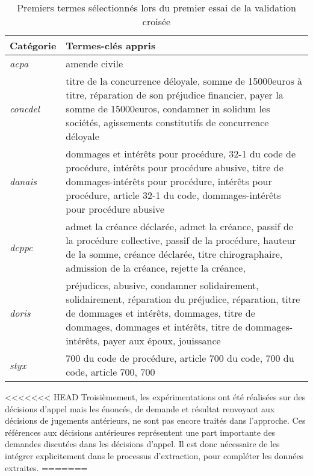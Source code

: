 \begin{table}[!htb]
		\centering\scriptsize
	\begin{tabular}{|l|p{}|}
		\hline
		\textbf{Catégorie} & \textbf{Termes-clés appris} \\ \hline
		\textit{acpa}    & amende civile                                                                                                                                                                                                                               \\ \hline
		\textit{concdel} & titre de la concurrence déloyale, somme de 15000euros à titre, réparation de son préjudice financier, payer la somme de 15000euros, condamner in solidum les sociétés, agissements constitutifs de concurrence déloyale                   \\ \hline
		\textit{danais}  & dommages et intérêts pour procédure, 32-1 du code de procédure, intérêts pour procédure abusive, titre de dommages-intérêts pour procédure, intérêts pour procédure, article 32-1 du code, dommages-intérêts pour procédure abusive         \\ \hline
		\textit{dcppc}   & admet la créance déclarée, admet la créance, passif de la procédure collective, passif de la procédure, hauteur de la somme, créance déclarée, titre chirographaire, admission de la créance, rejette la créance,                           \\ \hline
		\textit{doris}   & préjudices, abusive, condamner solidairement, solidairement, réparation du préjudice, réparation, titre de dommages et intérêts, dommages, titre de dommages, dommages et intérêts, titre de dommages-intérêts, payer aux époux, jouissance \\ \hline
		\textit{styx}    & 700 du code de procédure, article 700 du code, 700 du code, article 700, 700                                                                                                                                                                \\ \hline
	\end{tabular}
\caption{Premiers termes sélectionnés lors du premier essai de la validation croisée} \label{tab:quanta:exemples_termes}
\end{table}

<<<<<<< HEAD
Troisièmement, les expérimentations ont été réalisées sur des décisions d'appel mais les énoncés, de demande et résultat renvoyant aux décisions de jugements antérieurs, ne sont pas encore traités dans l'approche. Ces références aux décisions antérieures représentent une part importante des demandes discutées dans les décisions d'appel. Il est donc nécessaire de les intégrer explicitement dans le processus d'extraction, pour compléter les données extraites.
=======
